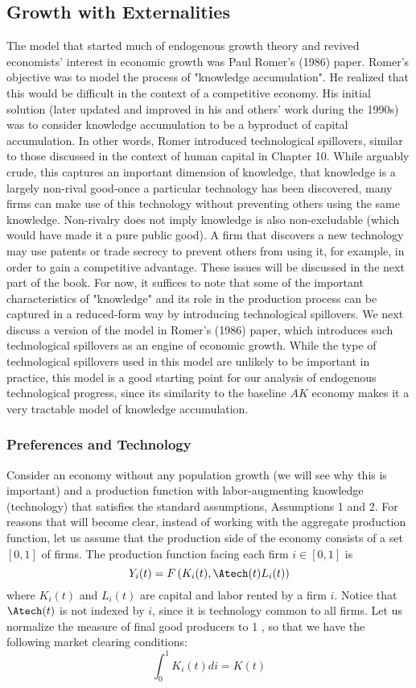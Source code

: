\documentclass[\topdir/lecture\_notes.tex]{subfiles}
\begin{document}
\subsection{Growth with Externalities}
The model that started much of endogenous growth theory and revived economists' interest in economic growth was Paul Romer's (1986) paper. Romer's objective was to model the process of "knowledge accumulation". He realized that this would be difficult in the context of a competitive economy. His initial solution (later updated and improved in his and others' work during the 1990s) was to consider knowledge accumulation to be a byproduct of capital accumulation. In other words, Romer introduced technological spillovers, similar to those discussed in the context of human capital in Chapter 10. While arguably crude, this captures an important dimension of knowledge, that knowledge is a largely non-rival good-once a particular technology has been discovered, many firms can make use of this technology without preventing others using the same knowledge. Non-rivalry does not imply knowledge is also non-excludable (which would have made it a pure public good). A firm that discovers a new technology may use patents or trade secrecy to prevent others from using it, for example, in order to gain a competitive advantage. These issues will be discussed in the next part of the book. For now, it suffices to note that some of the important characteristics of "knowledge" and its role in the production process can be captured in a reduced-form way by introducing technological spillovers. We next discuss a version of the model in Romer's (1986) paper, which introduces such technological spillovers as an engine of economic growth. While the type of technological spillovers used in this model are unlikely to be important in practice, this model is a good starting point for our analysis of endogenous technological progress, since its similarity to the baseline $AK$ economy makes it a very tractable model of knowledge accumulation.\\
\subsubsection{Preferences and Technology}
Consider an economy without any population growth (we will see why this is important) and a production function with labor-augmenting knowledge (technology) that satisfies the standard assumptions, Assumptions 1 and 2. For reasons that will become clear, instead of working with the aggregate production function, let us assume that the production side of the economy consists of a set $[0,1]$ of firms. The production function facing each firm $i \in[0,1]$ is
\[
Y_{i}(t)=F\left(K_{i}(t), \Atech(t) L_{i}(t)\right)
\] where $K_i(t)$ and $L_i(t)$ are capital and labor rented by a firm $i$. Notice that $\Atech(t)$ is not indexed by $i$, since it is technology common to all firms. Let us normalize the measure of final good producers to 1 , so that we have the following market clearing conditions:
\[
\int_{0}^{1} K_{i}(t) d i=K(t)
\]
\end{document}
